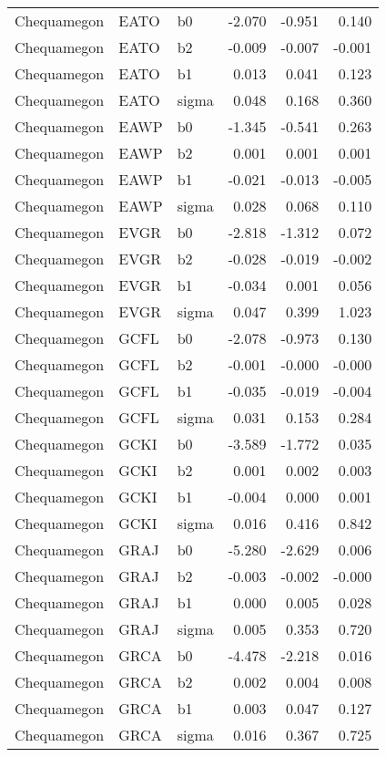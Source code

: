 \begin{table}[ht]
\begin{center}
\begin{tabular}{lllrrr}
  Chequamegon & EATO & b0 & -2.070 & -0.951 & 0.140 \\ 
  Chequamegon & EATO & b2 & -0.009 & -0.007 & -0.001 \\ 
  Chequamegon & EATO & b1 & 0.013 & 0.041 & 0.123 \\ 
  Chequamegon & EATO & sigma & 0.048 & 0.168 & 0.360 \\ 
  Chequamegon & EAWP & b0 & -1.345 & -0.541 & 0.263 \\ 
  Chequamegon & EAWP & b2 & 0.001 & 0.001 & 0.001 \\ 
  Chequamegon & EAWP & b1 & -0.021 & -0.013 & -0.005 \\ 
  Chequamegon & EAWP & sigma & 0.028 & 0.068 & 0.110 \\ 
  Chequamegon & EVGR & b0 & -2.818 & -1.312 & 0.072 \\ 
  Chequamegon & EVGR & b2 & -0.028 & -0.019 & -0.002 \\ 
  Chequamegon & EVGR & b1 & -0.034 & 0.001 & 0.056 \\ 
  Chequamegon & EVGR & sigma & 0.047 & 0.399 & 1.023 \\ 
  Chequamegon & GCFL & b0 & -2.078 & -0.973 & 0.130 \\ 
  Chequamegon & GCFL & b2 & -0.001 & -0.000 & -0.000 \\ 
  Chequamegon & GCFL & b1 & -0.035 & -0.019 & -0.004 \\ 
  Chequamegon & GCFL & sigma & 0.031 & 0.153 & 0.284 \\ 
  Chequamegon & GCKI & b0 & -3.589 & -1.772 & 0.035 \\ 
  Chequamegon & GCKI & b2 & 0.001 & 0.002 & 0.003 \\ 
  Chequamegon & GCKI & b1 & -0.004 & 0.000 & 0.001 \\ 
  Chequamegon & GCKI & sigma & 0.016 & 0.416 & 0.842 \\ 
  Chequamegon & GRAJ & b0 & -5.280 & -2.629 & 0.006 \\ 
  Chequamegon & GRAJ & b2 & -0.003 & -0.002 & -0.000 \\ 
  Chequamegon & GRAJ & b1 & 0.000 & 0.005 & 0.028 \\ 
  Chequamegon & GRAJ & sigma & 0.005 & 0.353 & 0.720 \\ 
  Chequamegon & GRCA & b0 & -4.478 & -2.218 & 0.016 \\ 
  Chequamegon & GRCA & b2 & 0.002 & 0.004 & 0.008 \\ 
  Chequamegon & GRCA & b1 & 0.003 & 0.047 & 0.127 \\ 
  Chequamegon & GRCA & sigma & 0.016 & 0.367 & 0.725 \\ 

\end{tabular}
\end{center}
\end{table}
